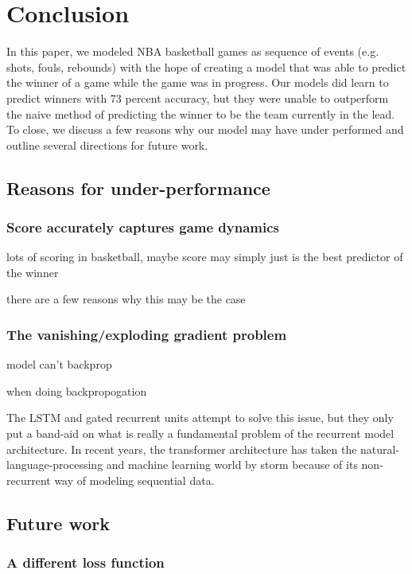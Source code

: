 \section{Conclusion}

In this paper, we modeled NBA basketball games as sequence of events (e.g. shots, fouls, rebounds) with the hope of creating a model that was able to predict the winner of a game while the game was in progress. Our models did learn to predict winners with 73 percent accuracy, but they were unable to outperform the naive method of predicting the winner to be the team currently in the lead. To close, we discuss a few reasons why our model may have under performed and outline several directions for future work.

\subsection{Reasons for under-performance}

\subsubsection{Score accurately captures game dynamics}

lots of scoring in basketball, maybe score may simply just is the best predictor of the winner

there are a few reasons why this may be the case

\subsubsection{The vanishing/exploding gradient problem}

model can't backprop

when doing backpropogation

The LSTM and gated recurrent units attempt to solve this issue, but they only put a band-aid on what is really a fundamental problem of the recurrent model architecture. In recent years, the transformer architecture \cite{attention-is-all-you-need} has taken the natural-language-processing and machine learning world by storm because of its non-recurrent way of modeling sequential data.

\subsection{Future work}

\subsubsection{A different loss function}

